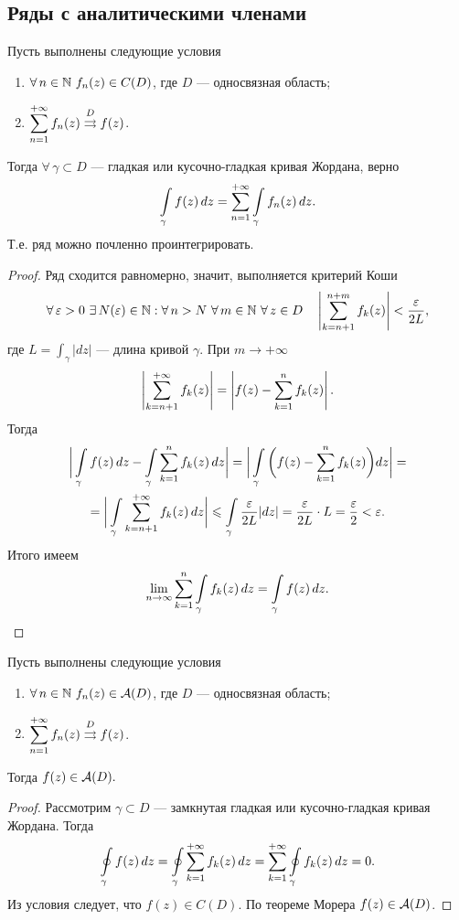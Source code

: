 	\subsection{Ряды с аналитическими членами}
	\begin{theorem}
		Пусть выполнены следующие условия
		\begin{enumerate}
			\item $\forall\,n\in\mathbb{N}\ f_n(z)\in C(D)$, где $D$ --- односвязная область;
			\item $\displaystyle\sum\limits_{n=1}^{+\infty}f_n(z)\overset{D}\rightrightarrows f(z)$.
		\end{enumerate}
		Тогда $\forall\,\gamma\subset D$ --- гладкая или кусочно-гладкая кривая Жордана, верно
		\[ \int\limits_\gamma f(z)\,dz = \sum\limits_{n=1}^{+\infty}\int\limits_\gamma f_n(z)\,dz. \]
		Т.е. ряд можно почленно проинтегрировать.
	\end{theorem}
	\begin{proof}
		Ряд сходится равномерно, значит, выполняется критерий Коши
		\[\forall\,\epsilon>0\ \exists\,N(\epsilon)\in\N: \forall\,n>N\ \forall\,m\in\N\ \forall\,z\in D\quad \left|\Sum_{k = n+1}^{n+m}f_k(z)\right|<\frac{\epsilon}{2L}, \]
		где $L = \int_\gamma |dz|$ --- длина кривой $\gamma$. При $m\to+\infty$
		\[ \left|\sum\limits_{k = n+1}^{+\infty}f_k(z)\right| =\left|f(z)-\sum\limits_{k=1}^nf_k(z) \right|.\]
		Тогда
		\begin{multline*}
			\bigg|\int\limits_\gamma f(z)\,dz-\int\limits_\gamma\sum\limits_{k=1}^nf_k(z)\,dz\bigg|=\bigg|\int\limits_\gamma\bigg(f(z)-\sum\limits_{k=1}^nf_k(z)\bigg)dz\bigg|=\\=\bigg| \int\limits_\gamma\sum\limits_{k = n+1}^{+\infty}f_k(z)\,dz \bigg| \leqslant \int\limits_\gamma\frac{\varepsilon}{2L}|dz| = \frac{\varepsilon}{2L}\cdot L = \frac{\varepsilon}{2} < \varepsilon.
		\end{multline*}
		Итого имеем
		\[ \lim\limits_{n\to\infty}\sum\limits_{k=1}^n\int\limits_\gamma f_k(z)\,dz = \int\limits_\gamma f(z)\,dz. \]
	\end{proof}
	\vspace{-\baselineskip}
	\begin{theorem}
		Пусть выполнены следующие условия
		\begin{enumerate}
			\item $\forall\,n\in\N\ f_n(z)\in\A(D)$, где $D$ --- односвязная область;
			\item $\displaystyle\sum\limits_{n=1}^{+\infty}f_n(z)\overset{D}\rightrightarrows f(z)$.
		\end{enumerate}
		Тогда $f(z)\in\mathcal{A}(D).$
	\end{theorem}
	\newpage
	\begin{proof}
		Рассмотрим $\gamma\subset D$ --- замкнутая гладкая или кусочно-гладкая кривая Жордана. Тогда
		\[ \oint\limits_\gamma f(z)\,dz = \oint\limits_\gamma\sum\limits_{k=1}^{+\infty}f_k(z)\,dz = \sum\limits_{k=1}^{+\infty}\oint\limits_\gamma f_k(z)\,dz = 0.\]
		Из условия следует, что $f(z)\in C(D)$. По теореме Морера $f(z)\in\mathcal{A}(D)$.
	\end{proof}
